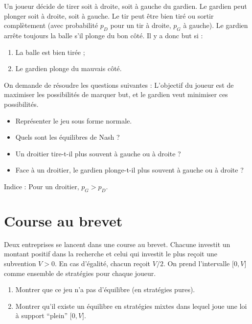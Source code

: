 Un joueur d\'ecide de tirer soit \`a droite, soit \`a gauche du
gardien. Le gardien peut plonger soit \`a droite, soit \`a gauche.
Le tir peut \^etre bien tir\'e ou sortir complètement (avec
probabilit\'e $p_D$ pour un tir \`a droite, $p_G$ \`a gauche). Le
gardien arr\^ete toujours la balle s'il plonge du bon c\^ot\'e. Il
y a donc but si :
\begin{enumerate}
\item La balle est bien tir\'ee ; %
\item Le gardien plonge du mauvais c\^ot\'e.
\end{enumerate}

On demande de résoudre les questions suivantes : L'objectif du
joueur est de maximiser les possibilit\'es de marquer but, et le
gardien veut minimiser ces possibilit\'es.
\begin{itemize}
\item Repr\'esenter le jeu sous forme normale. %
\item Quels sont les \'equilibres de Nash ? %
\item Un droitier tire-t-il plus souvent \`a gauche ou \`a droite
? %
\item Face \`a un droitier, le gardien plonge-t-il plus souvent
\`a gauche ou \`a droite ?
\end{itemize}
Indice : Pour un droitier, $p_G > p_D$.

\section{Course au brevet} Deux entreprises se lancent dans une course au
brevet. Chacune investit un montant positif dans la recherche et
celui qui investit le plus reçoit une subvention $V>0$. En cas
d'\'egalit\'e, chacun reçoit $V/2$. On prend l'intervalle $\lbrack
0,V\rbrack$ comme ensemble de strat\'egies pour chaque joueur.

\begin{enumerate}
\item Montrer que ce jeu n'a pas d'\'equilibre (en strat\'egies
pures). %
\item Montrer qu'il existe un \'equilibre en strat\'egies mixtes
dans lequel joue une loi \`a support ``plein'' $\lbrack
0,V\rbrack$.\
\end{enumerate}
